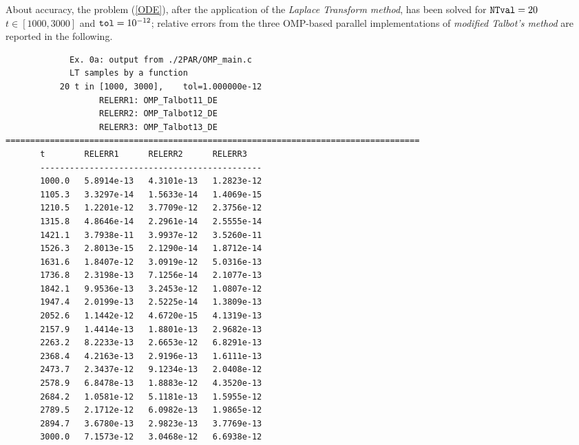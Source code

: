 \documentclass[a4paper,10pt]{report}%
\begin{document}
About accuracy, the problem (\ref{ODE}), after the application of the {\em Laplace Transform method}, has been
solved for ${\tt NTval}=20$ $t\in[1000,3000]$ and ${\tt tol}=10^{-12}$; relative errors from the three OMP-based
parallel implementations of {\em modified Talbot's method} are reported in the following.
\begin{lstlisting}
             Ex. 0a: output from ./2PAR/OMP_main.c
             LT samples by a function
           20 t in [1000, 3000],    tol=1.000000e-12
                   RELERR1: OMP_Talbot11_DE
                   RELERR2: OMP_Talbot12_DE
                   RELERR3: OMP_Talbot13_DE
====================================================================================
       t        RELERR1      RELERR2      RELERR3
       --------------------------------------------- 
       1000.0   5.8914e-13   4.3101e-13   1.2823e-12
       1105.3   3.3297e-14   1.5633e-14   1.4069e-15
       1210.5   1.2201e-12   3.7709e-12   2.3756e-12
       1315.8   4.8646e-14   2.2961e-14   2.5555e-14
       1421.1   3.7938e-11   3.9937e-12   3.5260e-11
       1526.3   2.8013e-15   2.1290e-14   1.8712e-14
       1631.6   1.8407e-12   3.0919e-12   5.0316e-13
       1736.8   2.3198e-13   7.1256e-14   2.1077e-13
       1842.1   9.9536e-13   3.2453e-12   1.0807e-12
       1947.4   2.0199e-13   2.5225e-14   1.3809e-13
       2052.6   1.1442e-12   4.6720e-15   4.1319e-13
       2157.9   1.4414e-13   1.8801e-13   2.9682e-13
       2263.2   8.2233e-13   2.6653e-12   6.8291e-13
       2368.4   4.2163e-13   2.9196e-13   1.6111e-13
       2473.7   2.3437e-12   9.1234e-13   2.0408e-12
       2578.9   6.8478e-13   1.8883e-12   4.3520e-13
       2684.2   1.0581e-12   5.1181e-13   1.5955e-12
       2789.5   2.1712e-12   6.0982e-13   1.9865e-12
       2894.7   3.6780e-13   2.9823e-13   3.7769e-13
       3000.0   7.1573e-12   3.0468e-12   6.6938e-12
\end{lstlisting}
\end{document}
